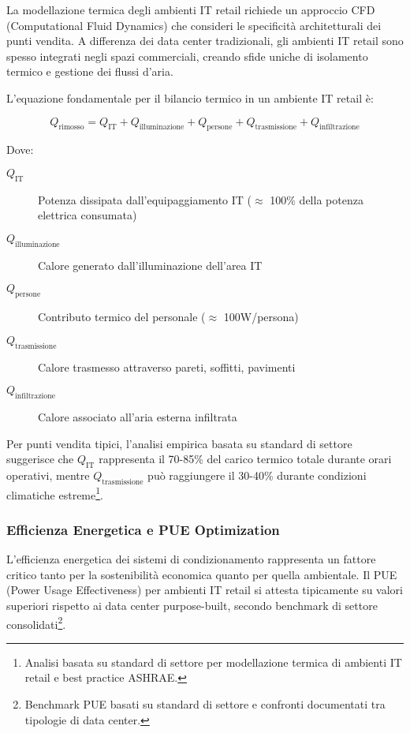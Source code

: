 La modellazione termica degli ambienti IT retail richiede un approccio CFD (Computational Fluid Dynamics) che consideri le specificità architetturali dei punti vendita. A differenza dei data center tradizionali, gli ambienti IT retail sono spesso integrati negli spazi commerciali, creando sfide uniche di isolamento termico e gestione dei flussi d'aria.

L'equazione fondamentale per il bilancio termico in un ambiente IT retail è:

\begin{equation}
Q_{\text{rimosso}} = Q_{\text{IT}} + Q_{\text{illuminazione}} + Q_{\text{persone}} + Q_{\text{trasmissione}} + Q_{\text{infiltrazione}}
\label{eq:bilancio-termico}
\end{equation}

Dove:
\begin{description}
    \item[$Q_{\text{IT}}$] Potenza dissipata dall'equipaggiamento IT ($\approx$ 100\% della potenza elettrica consumata)
    \item[$Q_{\text{illuminazione}}$] Calore generato dall'illuminazione dell'area IT
    \item[$Q_{\text{persone}}$] Contributo termico del personale ($\approx$ 100W/persona)
    \item[$Q_{\text{trasmissione}}$] Calore trasmesso attraverso pareti, soffitti, pavimenti
    \item[$Q_{\text{infiltrazione}}$] Calore associato all'aria esterna infiltrata
\end{description}

Per punti vendita tipici, l'analisi empirica basata su standard di settore suggerisce che $Q_{\text{IT}}$ rappresenta il 70-85\% del carico termico totale durante orari operativi, mentre $Q_{\text{trasmissione}}$ può raggiungere il 30-40\% durante condizioni climatiche estreme\footnote{Analisi basata su standard di settore per modellazione termica di ambienti IT retail e best practice ASHRAE.}.

\subsubsection{Efficienza Energetica e PUE Optimization}

L'efficienza energetica dei sistemi di condizionamento rappresenta un fattore critico tanto per la sostenibilità economica quanto per quella ambientale. Il PUE (Power Usage Effectiveness) per ambienti IT retail si attesta tipicamente su valori superiori rispetto ai data center purpose-built, secondo benchmark di settore consolidati\footnote{Benchmark PUE basati su standard di settore e confronti documentati tra tipologie di data center.}.

